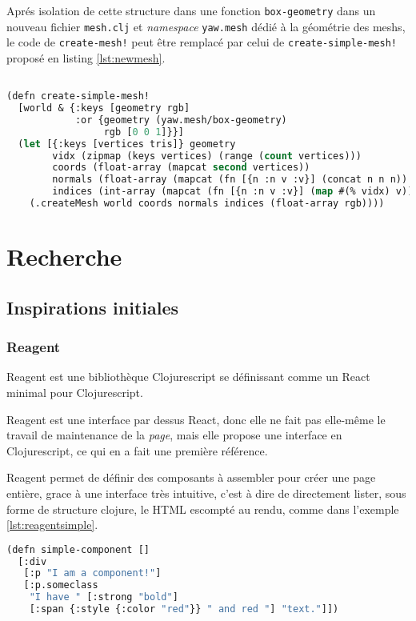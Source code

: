 \documentclass{report}
\begin{document}
Aprés isolation de cette structure dans une fonction \lstinline|box-geometry|
dans un nouveau fichier \texttt{mesh.clj} et \emph{namespace} \texttt{yaw.mesh} dédié à la géométrie des meshs, le
code de \lstinline|create-mesh!| peut être remplacé par celui de
\lstinline|create-simple-mesh!| proposé en listing \ref{lst:newmesh}.
              
\begin{lstlisting}[caption=Code complet de \texttt{create-simple-mesh!},label={lst:newmesh},language=Lisp]

(defn create-simple-mesh!
  [world & {:keys [geometry rgb]
            :or {geometry (yaw.mesh/box-geometry)
                 rgb [0 0 1]}}]
  (let [{:keys [vertices tris]} geometry
        vidx (zipmap (keys vertices) (range (count vertices)))
        coords (float-array (mapcat second vertices))
        normals (float-array (mapcat (fn [{n :n v :v}] (concat n n n)) tris))
        indices (int-array (mapcat (fn [{n :n v :v}] (map #(% vidx) v)) tris))]
    (.createMesh world coords normals indices (float-array rgb))))

\end{lstlisting}

\chapter{Recherche}

\section{Inspirations initiales}
\subsection{Reagent}

Reagent est une bibliothèque Clojurescript se définissant comme un \og React
minimal pour Clojurescript.\fg{}

Reagent est une interface par dessus React, donc elle ne fait pas elle-même le
travail de maintenance de la \emph{page}, mais elle propose une interface en
Clojurescript, ce qui en a fait une première référence.

Reagent permet de définir des composants à assembler pour créer une page
entière, grace à une interface très intuitive, c'est à dire de directement
lister, sous forme de structure clojure, le HTML escompté au rendu, comme dans
l'exemple \ref{lst:reagentsimple}.

\begin{lstlisting}[caption=Composant Reagent simple,label={lst:reagentsimple},language=Lisp]
(defn simple-component []
  [:div
   [:p "I am a component!"]
   [:p.someclass
    "I have " [:strong "bold"]
    [:span {:style {:color "red"}} " and red "] "text."]])
\end{lstlisting}
\end{document}
